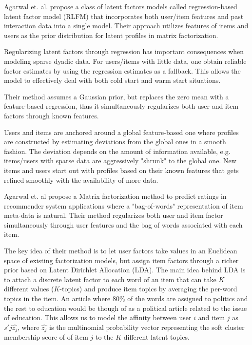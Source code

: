 
Agarwal et. al. \cite{Agarwal2009} propose a class of latent factors models called regression-based latent factor model (RLFM) that incorporates both user/item features and past interaction data into a single model. Their approach utilizes features of items and users as the
prior distribution for latent profiles in matrix factorization.

Regularizing latent factors through regression has important consequences when modeling sparse dyadic data. For users/items with little data, one obtain reliable factor estimates by using the regression estimates as a fallback. This allows the model to effectively deal with both cold start and warm start situations.

Their method assumes a Gaussian prior, but replaces the zero mean with a feature-based regression, thus it simultaneously regularizes both user and item factors through known features. 

Users and items are anchored around a global feature-based one where profiles are constructed by estimating deviations from the global ones in a smooth fashion. The deviation depends on the amount of information available, e.g. items/users with sparse data are aggressively "shrunk" to the global one. New items and users start out with profiles based on their known features that gets refined smoothly with the availability of more data. %


Agarwal et. al \cite{Agarwal2010} propose a Matrix factorization method to predict ratings in recommender system
applications where a "bag-of-words" representation of item meta-data is natural. Their method regularizes both user and item factor simultaneously through user features and the bag of words associated with each item.

The key idea of their method is to let user factors take values in an Euclidean space of existing factorization models, but assign item factors through a richer prior based on Latent Dirichlet Allocation (LDA). The main idea behind LDA is to attach a discrete latent factor to each word of an item that can take $K$ different values ($K$-topics) and produce item topics by averaging the per-word topics in the item. An article where 80$\%$ of the words are assigned to politics and the rest to education would be though of as a political article related to the issue of education. This allows us to model the affinity between user $i$ and item $j$ as $s'{j}\hat{z_{j}}$, where $\hat{z_{j}}$ is the multinomial probability vector representing the soft cluster membership score of of item $j$ to the $K$ different latent topics. 

